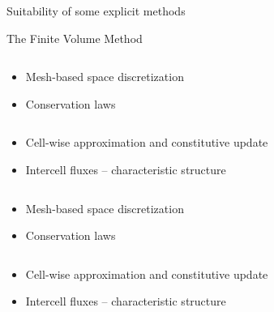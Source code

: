 \begin{frame}{Suitability of some explicit methods}
  \begin{block}{The Finite Volume Method \cite{Leveque}}
    \vskip 4pt
    \begin{overprint}
      \begin{columns}
        \begin{footnotesize}
          \begin{column}{0.4\textwidth}
            \begin{itemize}
            \item[] Mesh-based space discretization
            \item[] Conservation laws
            \end{itemize}
        \end{column}
        \begin{column}{0.6\textwidth}
            \begin{itemize}
            \item[] Cell-wise approximation and constitutive update
            \item[] Intercell fluxes -- characteristic structure \cite{Godunov_method}
            \end{itemize}
          \end{column}
        \end{footnotesize}
      \end{columns}
      \begin{columns}
        \begin{footnotesize}
          \begin{column}{0.4\textwidth}
            \begin{itemize}
            \item[] Mesh-based space discretization
            \item[] Conservation laws
            \end{itemize}
          \end{column}
          \begin{column}{0.6\textwidth}
            \begin{itemize}
            \item[] Cell-wise approximation and constitutive update
            \item[] Intercell fluxes -- characteristic structure \cite{Godunov_method}
            \end{itemize}
          \end{column}

\end{footnotesize}
\end{columns}
\end{overprint}
\end{block}
\end{frame}
